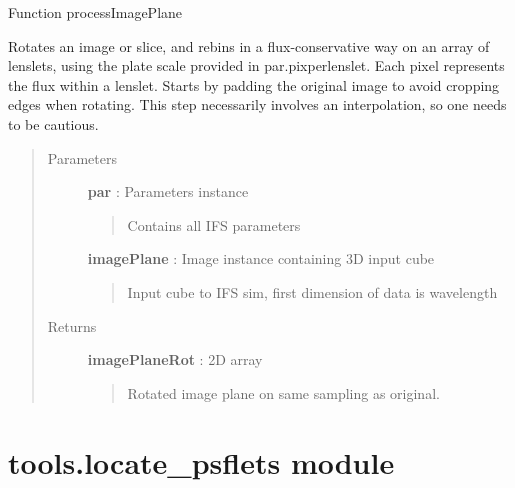 \documentclass[letterpaper,10pt,english]{sphinxmanual}
\begin{document}

\begin{fulllineitems}
\label{tools:tools.lenslet.processImagePlane}
Function processImagePlane

Rotates an image or slice, and rebins in a flux-conservative way
on an array of lenslets, using the plate scale provided in par.pixperlenslet.
Each pixel represents the flux within a lenslet. Starts by padding the original
image to avoid cropping edges when rotating. This step necessarily involves an
interpolation, so one needs to be cautious.
\begin{quote}\begin{description}
\item[{Parameters}] \leavevmode
\textbf{par} :   Parameters instance
\begin{quote}

Contains all IFS parameters
\end{quote}

\textbf{imagePlane} : Image instance containing 3D input cube
\begin{quote}

Input cube to IFS sim, first dimension of data is wavelength
\end{quote}

\item[{Returns}] \leavevmode
\textbf{imagePlaneRot} : 2D array
\begin{quote}

Rotated image plane on same sampling as original.
\end{quote}

\end{description}\end{quote}

\end{fulllineitems}



\section{tools.locate\_psflets module}
\label{tools:tools-locate-psflets-module}\label{tools:module-tools.locate_psflets}
\end{document}
